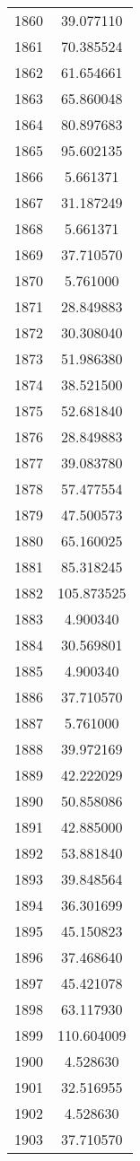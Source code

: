 \documentclass[12pt]{article}
\begin{document}
\begin{longtable}{@{}cc@{}}
1860 & 39.077110 \\
1861 & 70.385524 \\
1862 & 61.654661 \\
1863 & 65.860048 \\
1864 & 80.897683 \\
1865 & 95.602135 \\
1866 & 5.661371 \\
1867 & 31.187249 \\
1868 & 5.661371 \\
1869 & 37.710570 \\
1870 & 5.761000 \\
1871 & 28.849883 \\
1872 & 30.308040 \\
1873 & 51.986380 \\
1874 & 38.521500 \\
1875 & 52.681840 \\
1876 & 28.849883 \\
1877 & 39.083780 \\
1878 & 57.477554 \\
1879 & 47.500573 \\
1880 & 65.160025 \\
1881 & 85.318245 \\
1882 & 105.873525 \\
1883 & 4.900340 \\
1884 & 30.569801 \\
1885 & 4.900340 \\
1886 & 37.710570 \\
1887 & 5.761000 \\
1888 & 39.972169 \\
1889 & 42.222029 \\
1890 & 50.858086 \\
1891 & 42.885000 \\
1892 & 53.881840 \\
1893 & 39.848564 \\
1894 & 36.301699 \\
1895 & 45.150823 \\
1896 & 37.468640 \\
1897 & 45.421078 \\
1898 & 63.117930 \\
1899 & 110.604009 \\
1900 & 4.528630 \\
1901 & 32.516955 \\
1902 & 4.528630 \\
1903 & 37.710570 \\

\end{longtable}
\end{document}
